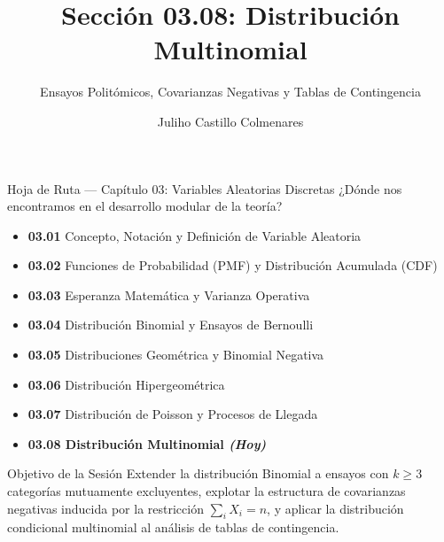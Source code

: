 \documentclass[10pt, aspectratio=169]{beamer}
\title[Distribución Multinomial]{Sección 03.08: Distribución Multinomial}
\subtitle{Ensayos Politómicos, Covarianzas Negativas y Tablas de Contingencia}
\author[J. Castillo Colmenares]{Juliho Castillo Colmenares}
\institute{Tecnológico de Monterrey}
\date{\vspace{-1.2cm}}
\begin{document}
\begin{frame}[plain]
  \vspace{-0.8cm}
  \titlepage
\end{frame}

\begin{frame}{Hoja de Ruta --- Capítulo 03: Variables Aleatorias Discretas}
  \footnotesize
  ¿Dónde nos encontramos en el desarrollo modular de la teoría? \pause
  \begin{itemize}\itemsep=0.08em
    \item \textbf{03.01} Concepto, Notación y Definición de Variable Aleatoria \pause
    \item \textbf{03.02} Funciones de Probabilidad (PMF) y Distribución Acumulada (CDF) \pause
    \item \textbf{03.03} Esperanza Matemática y Varianza Operativa \pause
    \item \textbf{03.04} Distribución Binomial y Ensayos de Bernoulli \pause
    \item \textbf{03.05} Distribuciones Geométrica y Binomial Negativa \pause
    \item \textbf{03.06} Distribución Hipergeométrica \pause
    \item \textbf{03.07} Distribución de Poisson y Procesos de Llegada \pause
    \item \color{TecRojo}\textbf{03.08 Distribución Multinomial \emph{(Hoy)}}\color{black}
  \end{itemize}
  \vspace{-0.1cm}
  \begin{block}{Objetivo de la Sesión}
    Extender la distribución Binomial a ensayos con $k \ge 3$ categorías mutuamente excluyentes, explotar la estructura de covarianzas negativas inducida por la restricción $\sum_{i} X_{i} = n$, y aplicar la distribución condicional multinomial al análisis de tablas de contingencia.
  \end{block}
\end{frame}
\end{document}

